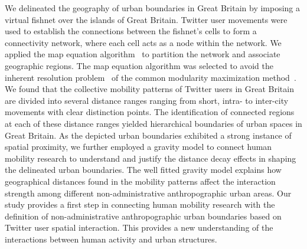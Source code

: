 \documentclass[]{tGIS2e}
\begin{document}
We delineated the geography of urban boundaries in Great Britain by imposing a virtual fishnet over the islands of Great Britain.
Twitter user movements were used to establish the connections between the fishnet's cells to form a connectivity network, where each cell acts as a node within the network.
We applied the map equation algorithm~\citep{domenico2015} to partition the network and associate geographic regions.
The map equation algorithm was selected to avoid the inherent resolution problem~\citep{fortunato2007} of the common modularity maximization method~\citep{newman2006}. 
We found that the collective mobility patterns of Twitter users in Great Britain are divided into several distance ranges ranging from short, intra- to inter-city movements with clear distinction points. 
The identification of connected regions at each of these distance ranges yielded hierarchical boundaries of urban spaces in Great Britain.
As the depicted urban boundaries exhibited a strong instance of spatial proximity, we further employed a gravity model to connect human mobility research to understand and justify the distance decay effects in shaping the delineated urban boundaries.
The well fitted gravity model explains how geographical distances found in the mobility patterns affect the interaction strength among different non-administrative anthropographic urban areas. 
Our study provides a first step in connecting human mobility research with the definition of non-administrative anthropographic urban boundaries based on Twitter user spatial interaction. 
This provides a new understanding of the interactions between human activity and urban structures. 
\end{document}
